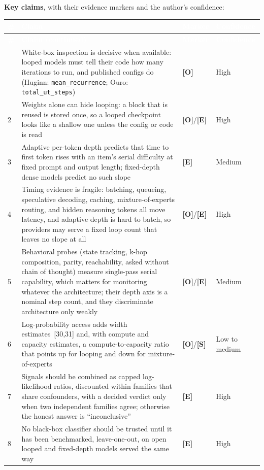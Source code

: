 \documentclass[11pt,letterpaper]{article}
\newcommand{\hd}[1]{\textcolor{white}{\bfseries #1}}
\newcommand{\tablefinish}{\arrayrulecolor{deepindigo}\specialrule{0.8pt}{0pt}{0pt}\arrayrulecolor{black}}
\newcommand{\zebra}{\rowcolors{2}{white}{paleindigo!75}}
\newcommand{\mO}{\textcolor{sensorteal}{\textbf{[O]}}}
\newcommand{\mE}{\textcolor{deepindigo}{\textbf{[E]}}}
\newcommand{\mS}{\textcolor{darkamber}{\textbf{[S]}}}
\newcommand{\cfg}[1]{\texttt{\small #1}}
\begin{document}
\textbf{Key claims}, with their evidence markers and the author's confidence:

{\footnotesize
\zebra
\begin{longtable}{L{0.4cm} L{12.05cm} L{1.2cm} L{1.85cm}}
\hd{\#} & \hd{Claim} & \hd{Marker} & \hd{Confidence} \\
\endfirsthead
{}
\hd{\#} & \hd{Claim (continued)} & \hd{Marker} & \hd{Confidence} \\
\endhead
\tablefinish
{} & White-box inspection is decisive when available: looped models must tell their code how many iterations to run, and published configs do (Huginn: \cfg{mean\_recurrence}; Ouro: \cfg{total\_ut\_steps}) & \mO & High \\
2 & Weights alone can hide looping: a block that is reused is stored once, so a looped checkpoint looks like a shallow one unless the config or code is read & \mO/\mE & High \\
3 & Adaptive per-token depth predicts that time to first token rises with an item's serial difficulty at fixed prompt and output length; fixed-depth dense models predict no such slope & \mE & Medium \\
4 & Timing evidence is fragile: batching, queueing, speculative decoding, caching, mixture-of-experts routing, and hidden reasoning tokens all move latency, and adaptive depth is hard to batch, so providers may serve a fixed loop count that leaves no slope at all & \mO/\mE & High \\
5 & Behavioral probes (state tracking, k-hop composition, parity, reachability, asked without chain of thought) measure single-pass serial capability, which matters for monitoring whatever the architecture; their depth axis is a nominal step count, and they discriminate architecture only weakly & \mO/\mE & Medium \\
6 & Log-probability access adds width estimates~[30,31] and, with compute and capacity estimates, a compute-to-capacity ratio that points up for looping and down for mixture-of-experts & \mO/\mS & Low to medium \\
7 & Signals should be combined as capped log-likelihood ratios, discounted within families that share confounders, with a decided verdict only when two independent families agree; otherwise the honest answer is ``inconclusive'' & \mE & High \\
8 & No black-box classifier should be trusted until it has been benchmarked, leave-one-out, on open looped and fixed-depth models served the same way & \mE & High \\
\end{longtable}
}
\end{document}
